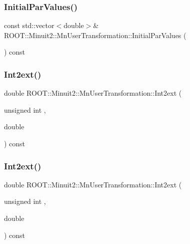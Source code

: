 \subsubsection{\texorpdfstring{InitialParValues()}{InitialParValues()}\hspace{0.1cm}{\footnotesize\ttfamily [3/3]}}
{\footnotesize\ttfamily const std\+::vector$<$double$>$\& R\+O\+O\+T\+::\+Minuit2\+::\+Mn\+User\+Transformation\+::\+Initial\+Par\+Values (\begin{DoxyParamCaption}{ }\end{DoxyParamCaption}) const\hspace{0.3cm}{\ttfamily [inline]}}

\mbox{\label{classROOT_1_1Minuit2_1_1MnUserTransformation_aa05e327d2e4376c0e1db865ba92becdd}} 
\subsubsection{\texorpdfstring{Int2ext()}{Int2ext()}\hspace{0.1cm}{\footnotesize\ttfamily [1/3]}}
{\footnotesize\ttfamily double R\+O\+O\+T\+::\+Minuit2\+::\+Mn\+User\+Transformation\+::\+Int2ext (\begin{DoxyParamCaption}\item[{unsigned int}]{,  }\item[{double}]{ }\end{DoxyParamCaption}) const}

\mbox{\label{classROOT_1_1Minuit2_1_1MnUserTransformation_aa05e327d2e4376c0e1db865ba92becdd}} 
\subsubsection{\texorpdfstring{Int2ext()}{Int2ext()}\hspace{0.1cm}{\footnotesize\ttfamily [2/3]}}
{\footnotesize\ttfamily double R\+O\+O\+T\+::\+Minuit2\+::\+Mn\+User\+Transformation\+::\+Int2ext (\begin{DoxyParamCaption}\item[{unsigned int}]{,  }\item[{double}]{ }\end{DoxyParamCaption}) const}

